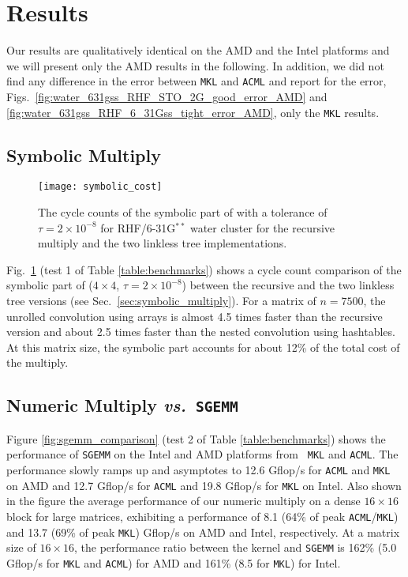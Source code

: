 \section{Results}
\label{sec:results}

Our results are qualitatively identical on the AMD and the Intel platforms and
we will present only the AMD results in the following. In addition, we did not
find any difference in the error between {\tt MKL} and {\tt ACML} and report
for the error, Figs.~\ref{fig:water_631gss_RHF_STO_2G_good_error_AMD} and
\ref{fig:water_631gss_RHF_6_31Gss_tight_error_AMD}, only the {\tt MKL}
results.

\subsection{Symbolic Multiply}

\begin{figure}
\texttt{[image: symbolic\_cost]}
\caption{\label{fig:symbolic_cost} The cycle counts of the symbolic part of
\SpAMM{} with a tolerance of $\tau = 2 \times 10^{-8}$ for RHF/6-31G${}^{**}$
water cluster for the recursive multiply and the two linkless tree
implementations.}
\end{figure}

Fig.~\ref{fig:symbolic_cost} (test 1 of Table \ref{table:benchmarks}) shows a
cycle count comparison of the symbolic part of \SpAMM{}($4 \times 4$, $\tau =
2 \times 10^{-8}$) between the recursive and the two linkless tree versions
(see Sec.~\ref{sec:symbolic_multiply}). For a matrix of $n = 7500$, the
unrolled convolution using arrays is almost 4.5 times faster than the
recursive version and about 2.5 times faster than the nested convolution using
hashtables. At this matrix size, the symbolic part accounts for about 12\% of
the total cost of the multiply.

\subsection{Numeric Multiply \emph{vs.}~{\tt SGEMM}}

Figure \ref{fig:sgemm_comparison} (test 2 of Table \ref{table:benchmarks})
shows the performance of {\tt SGEMM} on the Intel and AMD platforms from {\tt
MKL} and {\tt ACML}. The performance slowly ramps up and asymptotes to 12.6
Gflop/s for {\tt ACML} and {\tt MKL} on AMD and 12.7 Gflop/s for {\tt ACML}
and 19.8 Gflop/s for {\tt MKL} on Intel.  Also shown in the figure the average
performance of our numeric multiply on a dense $16 \times 16$ block for large
matrices, exhibiting a performance of 8.1 (64\% of peak {\tt ACML}/{\tt MKL})
and 13.7 (69\% of peak {\tt MKL}) Gflop/s on AMD and Intel, respectively. At a
matrix size of $16 \times 16$, the performance ratio between the \SpAMM{}
kernel and {\tt SGEMM} is 162\% (5.0 Gflop/s for {\tt MKL} and {\tt ACML}) for
AMD and 161\% (8.5 for {\tt MKL}) for Intel.

